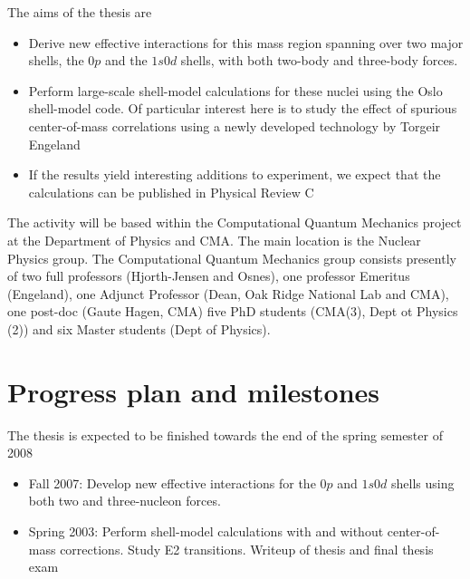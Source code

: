 The aims of the thesis are     

\begin{itemize} 
\item Derive new effective interactions for this mass region spanning over two
major shells, the $0p$ and the $1s0d$ shells, with both two-body and three-body forces.
\item Perform large-scale shell-model calculations for these nuclei using the Oslo
shell-model code.  Of particular interest here is to study the effect of spurious center-of-mass
correlations using a newly developed technology by Torgeir Engeland 
\item If the results yield interesting additions to experiment, we expect that the
calculations can be published in  Physical Review C 
\end{itemize}



The activity will be based within the 
Computational Quantum Mechanics project at the Department of Physics and 
CMA. The main location is the Nuclear Physics group. 
The Computational Quantum Mechanics group consists  
presently of two full professors (Hjorth-Jensen and Osnes), one professor Emeritus (Engeland), 
one Adjunct Professor (Dean, Oak Ridge National Lab and CMA), one post-doc (Gaute Hagen, CMA) five PhD
students (CMA(3), Dept ot Physics (2)) and six Master students (Dept of Physics).  

\section*{Progress plan and milestones}
The thesis is expected to be finished towards the end  of the spring 
semester of 2008
\begin{itemize}
\item Fall 2007: Develop new effective interactions for the $0p$ and $1s0d$ shells
using both two and three-nucleon forces.
\item Spring 2003:  Perform shell-model calculations with and without center-of-mass
corrections. Study E2 transitions.
Writeup of thesis and final thesis exam
\end{itemize}







































